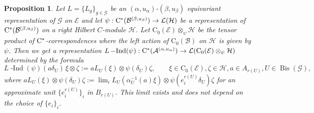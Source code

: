 \documentclass[11 pt, leqno]{amsart}
\numberwithin{equation}{section}
\theoremstyle{plain}
\newtheorem {prop}[thm] {Proposition}
\theoremstyle{definition}
\newcommand*{\contz}{\mathrm{C_0}}%
\DeclareMathOperator{\dashind}{-Ind}
\DeclareMathOperator{\Bis}{Bis}
\renewcommand{\H}{\mathcal H}
\newcommand{\B}{\mathcal B}
\newcommand{\LL}{\mathcal L}
\newcommand{\G}{\mathcal G} %
\newcommand{\EE}{\mathcal E}
\newcommand{\A}{\mathcal A}
\newcommand{\cst}{\ifmmode\mathrm{C}^*\else{$\mathrm{C}^*$}\fi}
\begin{document}
\begin{prop}\label{prop:representation_induced_by_equivariant_action}
Let $L=\{L_g\}_{g\in \G}$ be an $(\alpha, u_{\alpha})$-$(\beta,u_{\beta})$ equivariant representation of $\G$ on $\EE$ and let $\psi : \cst(\B^{(\beta,u_{\beta})})\to \LL(\H)$ be a representation of $\cst(\B^{(\beta,u_{\beta})})$ on a right Hilbert $C$-module $\H$.
Let $\contz(\EE)\otimes_{\psi} \H$ be the tensor product of $\cst$-correspondences where the left action of $\contz(\B)$ on $\H$ is given by $\psi$. 
Then we get a representation $L\dashind(\psi) : \cst(\A^{(\alpha,u_{\alpha})}) \to \LL(\contz(\EE)\otimes_{\psi} \H)$ determined by the formula
\[
    L\dashind(\psi)(a\delta_U)\, \xi\otimes \zeta :=  aL_U(\xi) \otimes \psi( \delta_U)\zeta , 
    \qquad \xi \in \contz(\EE), \zeta \in \H, a\in A_{r(U)}, U\in \Bis(\G) ,
\]
where $aL_U(\xi) \otimes \psi( \delta_U)\zeta := \lim_{i} L_U(\alpha_{U}^{-1}(a)\xi) \otimes \psi(e_{i}^{r(U)} \delta_U)\zeta$ for an approximate unit $\{e_{i}^{r(U)}\}_{i}$ in $B_{r(U)}$. 
This limit exists and does not depend on the choice of $\{e_i\}_i$.
\end{prop}
\end{document}
